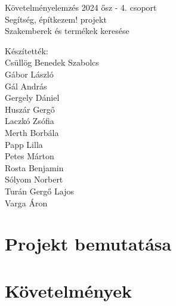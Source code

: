 \documentclass{report}
\begin{document}
\begin{titlepage}
   \centering
   \vspace{.7\baselineskip}
   { \huge
        Követelményelemzés 2024 ősz - 4. csoport \\[1em]
        Segítség, építkezem! projekt \\[2em]
        Szakemberek és termékek keresése \\ [5em]
   }

   Készítették: \\
    Csüllög Benedek Szabolcs \\
    Gábor László \\
    Gál András \\
    Gergely Dániel \\
    Huszár Gergő \\
    Laczkó Zsófia \\
    Merth Borbála \\
    Papp Lilla \\
    Petes Márton \\
    Rosta Benjamin \\
    Sólyom Norbert \\
    Turán Gergő Lajos \\
    Varga Áron \\

\end{titlepage}

\tableofcontents

\chapter{Projekt bemutatása}


\chapter{Követelmények}



\clearpage



\clearpage





\clearpage



\clearpage


\end{document}
